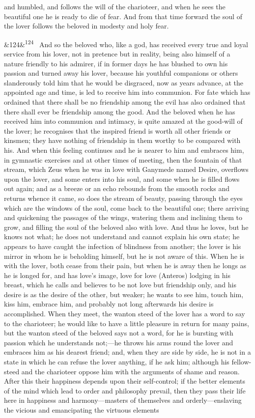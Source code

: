 \documentclass[12pt]{article}
\newcommand{\para}[1][]{\par\noindent\ifx&#1&\else\textsuperscript{\footnotesize #1}~\fi}
\begin{document}
and humbled, and follows the will of the charioteer, and when he sees the beautiful one he is ready to die of fear. And from that time forward the soul of the lover follows the beloved in modesty and holy fear.

\para[124] And so the beloved who, like a god, has received every true and loyal service from his lover, not in pretence but in reality, being also himself of a nature friendly to his admirer, if in former days he has blushed to own his passion and turned away his lover, because his youthful companions or others slanderously told him that he would be disgraced, now as years advance, at the appointed age and time, is led to receive him into communion. For fate which has ordained that there shall be no friendship among the evil has also ordained that there shall ever be friendship among the good. And the beloved when he has received him into communion and intimacy, is quite amazed at the good-will of the lover; he recognises that the inspired friend is worth all other friends or kinsmen; they have nothing of friendship in them worthy to be compared with his. And when this feeling continues and he is nearer to him and embraces him, in gymnastic exercises and at other times of meeting, then the fountain of that stream, which Zeus when he was in love with Ganymede named Desire, overflows upon the lover, and some enters into his soul, and some when he is filled flows out again; and as a breeze or an echo rebounds from the smooth rocks and returns whence it came, so does the stream of beauty, passing through the eyes which are the windows of the soul, come back to the beautiful one; there arriving and quickening the passages of the wings, watering them and inclining them to grow, and filling the soul of the beloved also with love. And thus he loves, but he knows not what; he does not understand and cannot explain his own state; he appears to have caught the infection of blindness from another; the lover is his mirror in whom he is beholding himself, but he is not aware of this. When he is with the lover, both cease from their pain, but when he is away then he longs as he is longed for, and has love's image, love for love (Anteros) lodging in his breast, which he calls and believes to be not love but friendship only, and his desire is as the desire of the other, but weaker; he wants to see him, touch him, kiss him, embrace him, and probably not long afterwards his desire is accomplished. When they meet, the wanton steed of the lover has a word to say to the charioteer; he would like to have a little pleasure in return for many pains, but the wanton steed of the beloved says not a word, for he is bursting with passion which he understands not;---he throws his arms round the lover and embraces him as his dearest friend; and, when they are side by side, he is not in a state in which he can refuse the lover anything, if he ask him; although his fellow-steed and the charioteer oppose him with the arguments of shame and reason. After this their happiness depends upon their self-control; if the better elements of the mind which lead to order and philosophy prevail, then they pass their life here in happiness and harmony---masters of themselves and orderly---enslaving the vicious and emancipating the virtuous elements 
\end{document}
